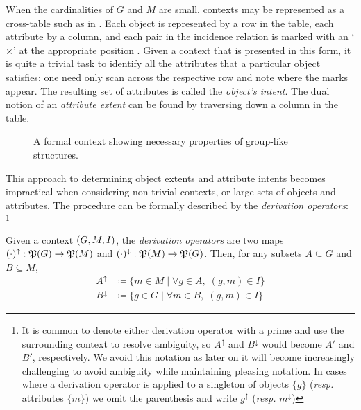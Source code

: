 When the cardinalities of $G$ and $M$ are small, contexts may be represented as a cross-table such as in . Each object is represented by a row in the table, each attribute by a
column, and each pair in the incidence relation is marked with an `$\times$' at the appropriate position \cite[pp. 17]{ganter1999formal}. Given a context that is presented in this form, it is quite a trivial
task to identify all the attributes that a particular object satisfies: one need only scan across the respective row and note where the marks appear. The resulting set of attributes is called the \textit{object's
intent}. The dual notion of an \textit{attribute extent} can be found by traversing down a column in the table.

\begin{figure}[H]
  \centering
  \small
  \begin{cxt}
    \label{cxt:grouplikes}      
          
      
  \end{cxt}
  \caption{A formal context showing necessary properties of group-like structures.}
  \label{context:formal-context-group-structures}
\end{figure}

This approach to determining object extents and attribute intents becomes impractical when considering non-trivial contexts, or large sets of objects and attributes. The procedure can be formally described
by the \textit{derivation operators}: \footnote{It is common to denote either derivation operator with a prime and use the surrounding context to resolve ambiguity, so $A^{\uparrow}$ and $B^{\downarrow}$
would become $A'$ and $B'$, respectively. We avoid this notation as later on it will become increasingly challenging to avoid ambiguity while maintaining pleasing notation. In cases where a derivation
operator is applied to a singleton of objects $\{g\}$ (\textit{resp.} attributes $\{m\}$) we omit the parenthesis and write $g^{\uparrow}$ (\textit{resp.} $m^{\downarrow}$)}

\begin{definition}
  \label{definition:derivation-operators}  Given a context $(G,M,\mathrel{I})$, the \textit{derivation operators} are two maps $(\cdot)^{\uparrow}: \mathfrak{P}({G})\to \mathfrak{P}({M})$ and $(\cdot )^{\downarrow}
  : \mathfrak{P}({M})\to \mathfrak{P}({G})$. Then, for any subsets $A \subseteq G$ and $B \subseteq M$,
  \begin{align*}
    A^{\uparrow}   & \coloneqq \{m \in M \mid \forall g \in A, \; (g,m) \in I\} \\
    B^{\downarrow} & \coloneqq \{g \in G \mid \forall m \in B, \; (g,m) \in I\}
  \end{align*}
\end{definition}

